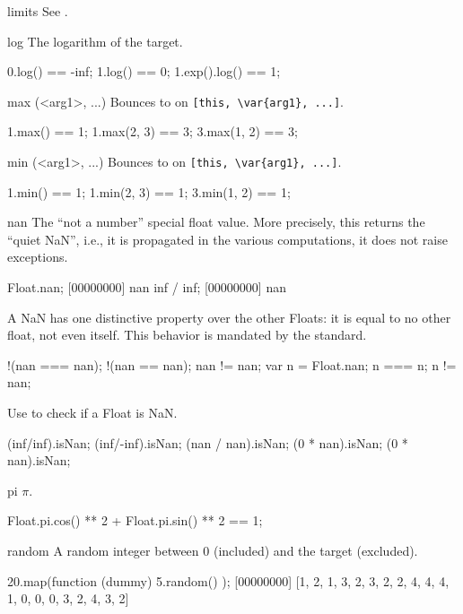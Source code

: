 \begin{urbiscriptapi}
\item[limits]
  See .


\item[log]%
  The logarithm of the target.
\begin{urbiassert}
0.log() == -inf;
1.log() == 0;
1.exp().log() == 1;
\end{urbiassert}


\item[max](<arg1>, ...)%
  Bounces to  on \lstinline|[this, \var{arg1}, ...]|.
\begin{urbiassert}
1.max() == 1;
1.max(2, 3) == 3;
3.max(1, 2) == 3;
\end{urbiassert}


\item[min](<arg1>, ...)%
  Bounces to  on \lstinline|[this, \var{arg1}, ...]|.
\begin{urbiassert}
1.min() == 1;
1.min(2, 3) == 1;
3.min(1, 2) == 1;
\end{urbiassert}


\item[nan]%
  The ``not a number'' special float value.  More precisely, this
  returns the ``quiet NaN'', i.e., it is propagated in the various
  computations, it does not raise exceptions.
\begin{urbiscript}
Float.nan;
[00000000] nan
inf / inf;
[00000000] nan
\end{urbiscript}

  A NaN has one distinctive property over the other Floats: it is equal to
  no other float, not even itself.  This behavior is mandated by the
   standard.
\begin{urbiassert}
!(nan === nan); !(nan == nan); nan != nan;
var n = Float.nan;
n === n;  n != nan;
\end{urbiassert}

  Use  to check if a Float is NaN.
\begin{urbiassert}
(inf/inf).isNan;   (inf/-inf).isNan;
(nan / nan).isNan;
(0 * nan).isNan;   (0 * nan).isNan;
\end{urbiassert}


\item[pi]
  $\pi$.
\begin{urbiassert}
Float.pi.cos() ** 2 + Float.pi.sin() ** 2 == 1;
\end{urbiassert}


\item[random]
  A random integer between 0 (included) and the target (excluded).
\begin{urbiscript}
20.map(function (dummy) { 5.random() });
[00000000] [1, 2, 1, 3, 2, 3, 2, 2, 4, 4, 4, 1, 0, 0, 0, 3, 2, 4, 3, 2]
\end{urbiscript}



\end{urbiscriptapi}
